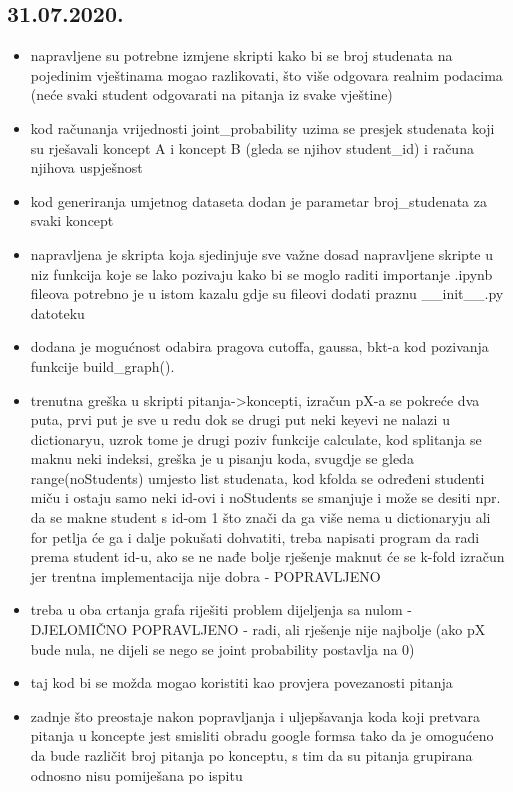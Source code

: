 \documentclass[times, utf8,projekt]{fer}
\begin{document}
		\subsection{31.07.2020.}
		\begin{itemize}
			\item napravljene su potrebne izmjene skripti kako bi se broj studenata na pojedinim vještinama mogao razlikovati, što više odgovara realnim podacima (neće svaki student odgovarati na pitanja iz svake vještine)
			\item kod računanja vrijednosti joint\_probability uzima se presjek studenata koji su rješavali koncept A i koncept B (gleda se njihov student\_id) i računa njihova uspješnost
			\item kod generiranja umjetnog dataseta dodan je parametar broj\_studenata za svaki koncept
			\item napravljena je skripta koja sjedinjuje sve važne dosad napravljene skripte u niz funkcija koje se lako pozivaju
			kako bi se moglo raditi importanje .ipynb fileova potrebno je u istom kazalu gdje su  fileovi dodati praznu \_\_init\_\_.py datoteku
			\item 	dodana je mogućnost odabira pragova cutoffa, gaussa, bkt-a kod pozivanja funkcije build\_graph().
			\item 	trenutna greška u skripti pitanja->koncepti, izračun pX-a se pokreće dva puta, prvi put je sve u redu dok se drugi put neki keyevi ne nalazi u dictionaryu, uzrok tome je drugi poziv funkcije calculate, kod splitanja se maknu neki indeksi, greška je u pisanju koda, svugdje se gleda range(noStudents) umjesto list studenata, kod kfolda se određeni studenti miču i ostaju samo neki id-ovi i noStudents se smanjuje i može se desiti npr. da se makne student s id-om 1 što znači da ga više nema u dictionaryju ali for petlja će ga i dalje pokušati dohvatiti, treba napisati program da radi prema student id-u, ako se ne nađe bolje rješenje maknut će se k-fold izračun jer trentna implementacija nije dobra - POPRAVLJENO
			\item 
			treba u oba crtanja grafa riješiti problem dijeljenja sa nulom - DJELOMIČNO POPRAVLJENO - radi, ali rješenje nije najbolje (ako pX bude nula, ne dijeli se nego se joint probability postavlja na 0)
			\item taj kod bi se možda mogao koristiti kao provjera povezanosti pitanja
			\item zadnje što preostaje nakon popravljanja i uljepšavanja koda koji pretvara pitanja u koncepte jest smisliti obradu google formsa tako da je omogućeno da bude različit broj pitanja po konceptu, s tim da su pitanja grupirana odnosno nisu pomiješana po ispitu
		\end{itemize}	
\end{document}
